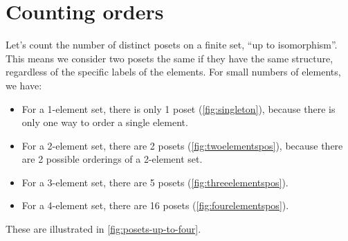 \section{Counting orders}


Let's count the number of distinct posets on a finite set, ``up to isomorphism''.
This means we consider two posets the same if they have the same structure, regardless of the specific labels of the elements.
For small numbers of elements, we have:
\begin{itemize}
    \item For a 1-element set, there is only 1 poset (\cref{fig:singleton}), because there is only one way to order a single element.
    \item For a 2-element set, there are 2 posets (\cref{fig:twoelementspos}), because there are 2 possible orderings of a 2-element set.
    \item For a 3-element set, there are 5 posets (\cref{fig:threeelementspos}).
    \item For a 4-element set, there are 16 posets (\cref{fig:fourelementspos}).
\end{itemize}
These are illustrated in \cref{fig:posets-up-to-four}.

\vfill

